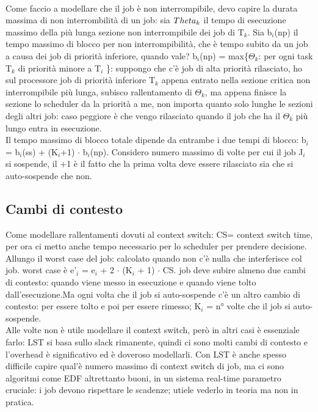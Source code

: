 \documentclass[12pt, oneside]{extbook}
\begin{document}
\\Come faccio a modellare che il job è non interrompibile, devo capire la durata massima di non interrombilità di un job: sia $\\Theta_{k}$ il tempo di esecuzione massimo della più lunga sezione non interrompibile dei job di T$_{k}$. Sia b$_{i}$(np) il tempo massimo di blocco per non interrompibilità, che è tempo subito da un job a causa dei job di priorità inferiore, quando vale? b$_{i}$(np) = max\{$\Theta_{k}$: per ogni task T$_{k}$ di priorità minore a T$_{i}$ \}: suppongo che c'è job di alta priorità rilasciato, ho sul processore job di priorità inferiore T$_{k}$ appena entrato nella sezione critica non interrompibile più lunga, subisco rallentamento di $\Theta_{k}$, ma appena finisce la sezione lo scheduler da la priorità a me, non importa quanto solo lunghe le sezioni degli altri job: caso peggiore è che vengo rilasciato quando il job che ha il $\Theta_{k}$ più lungo entra in esecuzione.\\ Il tempo massimo di blocco totale dipende da entrambe i due tempi di blocco:
b$_{i}$ = b$_{i}$(ss) + (K$_{i}$+1) $\cdot$ b$_{i}$(np). Considero numero massimo di volte per cui il job J$_{i}$ si sospende, il +1 è il fatto che la prima volta deve essere rilasciato sia che si auto-sospende che non.
\subsection{Cambi di contesto}
Come modellare rallentamenti dovuti al context switch: CS= context switch time, per ora ci metto anche tempo necessario per lo scheduler per prendere decisione.\\ Allungo il worst case del job: calcolato quando non c'è nulla che interferisce col job. worst case è e'$_{i}$ = e$_{i}$ + 2 $\cdot$ (K$_{i}$ + 1) $\cdot$ CS. job deve subire almeno due cambi di contesto: quando viene messo in esecuzione e quando viene tolto dall'esecuzione.Ma ogni volta che il job si auto-sospende  c'è un altro cambio di contesto: per essere tolto e poi per essere rimesso; K$_{i}$ = n° volte che il job si auto-sospende.\\ Alle volte non è utile modellare il context switch, però in altri casi è essenziale farlo: LST si basa sullo slack rimanente, quindi ci sono molti cambi di contesto e l'overhead è significativo ed è doveroso modellarli. Con LST è anche spesso difficile capire qual'è numero massimo di context switch di job, ma ci sono algoritmi come EDF altrettanto buoni, in un sistema real-time parametro cruciale: i job devono rispettare le scadenze; utiele vederlo in teoria ma non in pratica.
\end{document}
